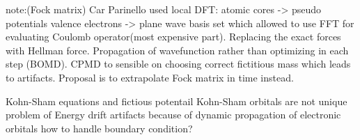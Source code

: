 \documentclass[12pt]{scrartcl}
\begin{document}
note:(Fock matrix)
Car Parinello used local DFT: atomic cores -> pseudo potentials
							  valence electrons -> plane wave basis set
which allowed to use FFT for evaluating Coulomb operator(most expensive part). Replacing the exact forces with Hellman force.  Propagation of wavefunction rather than optimizing in each step (BOMD). CPMD to sensible on choosing correct fictitious mass which leads to artifacts. Proposal is to extrapolate Fock matrix in time instead.




Kohn-Sham equations and fictious potentail
Kohn-Sham orbitals are not unique
problem of Energy drift
artifacts because of dynamic propagation of electronic orbitals
how to handle boundary condition?





\end{document}
